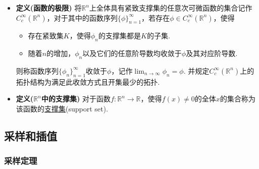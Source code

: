 \begin{itemize}
    \item [\(\bullet\)] \textbf{定义(函数的极限)}
    \newline
    将\(\mathbb{R}^n\)上全体具有紧致支撑集的任意次可微函数的集合记作\(C_c^{\infty}\left(\mathbb{R}^n\right)\)，对于其中的函数序列\(\{\phi\}_{n=1}^{\infty}\)，若存在\(\phi \in C_c^{\infty}\left(\mathbb{R}^n\right)\)，使得
    \begin{itemize}
        \item [(1)] 存在紧致集\(K\)，使得\(\phi_n\)的支撑集都是\(K\)的子集.
        \item [(2)] 随着\(n\)的增加，\(\phi_n\)以及它们的任意阶导数均收敛于\(\phi\)及其对应阶导数.
    \end{itemize}
    则称函数序列\(\{\phi_n\}_{n=1}^{\infty}\)收敛于\(\phi\)，记作\(\displaystyle{\lim_{n \to \infty}\phi_n=\phi}\). 并规定\(C_c^{\infty}\left(\mathbb{R}^n\right)\)上的拓扑结构为满足此收敛方式且开集最少的拓扑.
\end{itemize}

\begin{itemize}
    \item [\(\bullet\)] \textbf{定义(\(\mathbb{R}^n\)中的支撑集)}
    \newline
    对于函数\(f:\mathbb{R}^n \to \mathbb{R}\)，使得\(f(x) \neq 0\)的全体\(x\)的集合称为该函数的\uline{支撑集}(support set).
\end{itemize}

\subsection{采样和插值}

\subsubsection{采样定理}

